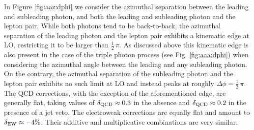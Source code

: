 In Figure \ref{fig:aaz:dphi} we consider the azimuthal separation 
between the leading and subleading photon, and both the leading 
and subleading photon and the lepton pair.
While both photons tend to be back-to-back, the azimuthal 
separation of the leading photon and the lepton pair exhibits 
a kinematic edge at LO, restricting it to be larger than 
$\tfrac{1}{2}\,\pi$. 
As discussed above this kinematic edge is also present in the case of the triple photon process
(see Fig. \ref{fig:aaa:dphi}) when considering the azimuthal angle between
the leading and any subleading photon.
On the contrary, the azimuthal separation of the subleading 
photon and the lepton pair exhibits no such limit at LO and 
instead peaks at roughly $\Delta\phi=\tfrac{1}{2}\,\pi$. 
The QCD corrections, with the exception of the aforementioned 
edge, are generally flat, taking values of $\delta_\text{QCD}\approx 0.3$ 
in the absence and $\delta_\text{QCD}\approx 0.2$ in the presence 
of a jet veto. 
The electroweak corrections are equally flat and amount to 
$\delta_\text{EW}\approx-4\%$. 
Their additive and multiplicative combinations are very 
similar.

